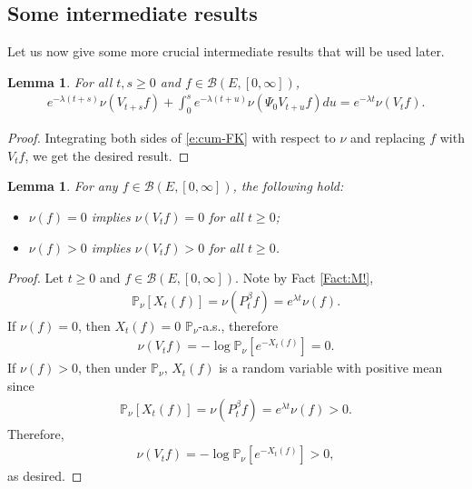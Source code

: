 \documentclass[12pt,a4paper]{amsart}
\numberwithin{equation}{section}
\theoremstyle{plain}
\newtheorem{lem}[thm]{Lemma}
\theoremstyle{definition}
\theoremstyle{remark}
\begin{document}
\subsection{Some intermediate results}
Let us now give some more crucial intermediate results that will be used later.
\begin{lem} \label{Lemma:nuP!}
For all $t, s\geq 0$ and $f\in \mathcal B(E,[0,\infty])$,
\begin{align}
  e^{- \lambda (t+s)} \nu(V_{t+s}f) + \int_0^s e^{- \lambda (t+u)} \nu(\Psi_0 V_{t+u}f) du
  = e^{- \lambda t} \nu(V_t f).
  \end{align}
\end{lem}
\begin{proof}
Integrating  both sides of 
\eqref{e:cum-FK}  with respect to $\nu$ and
replacing $f$ with $V_t f$, we get the desired result.
\end{proof}
\begin{lem} \label{Lemma:nVn!}
For any $f\in \mathcal B(E,[0,\infty])$, the following hold:
\begin{itemize}
\item
$\nu(f) = 0$ implies $\nu(V_tf)=0 $ for all $t\ge 0$;
\item
$\nu(f)>0$ implies $\nu(V_tf)>0$ for all $t\ge 0$.
\end{itemize}
\end{lem}
\begin{proof}
Let $t\geq 0$ and $f\in \mathcal B(E,[0,\infty])$.
Note by Fact \ref{Fact:M!},
\begin{align}
 \mathbb P_\nu[X_t(f)]
 = \nu (P_t^\beta f)
 = e^{\lambda t}\nu (f).
 \end{align}
If $\nu(f) = 0$, then 
$X_t(f)=0$ $\mathbb P_\nu$-a.s., therefore
\begin{align}
 \nu(V_t f)
 = - \log \mathbb P_\nu[e^{-X_t(f)}]
 =0.
 \end{align}
If $\nu(f) > 0$, then 
under $\mathbb P_\nu$, $X_t(f)$ is a random variable with positive mean since
\begin{align}
\mathbb P_\nu[X_t(f)] = \nu(P_t^\beta f) = e^{\lambda t} \nu(f)>0.
\end{align}
Therefore,
\begin{align}
 \nu(V_tf)
 = - \log \mathbb P_\nu[e^{-X_t(f)}]
 >0,
 \end{align}
as desired.
\end{proof}
\end{document}
